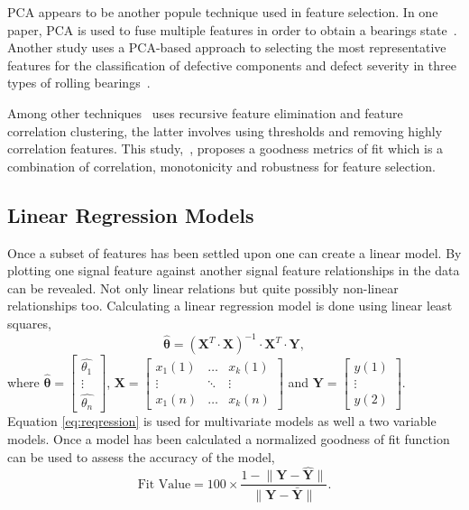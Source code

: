 \documentclass[]{article}
\begin{document}
\gls{PCA} appears to be another popule technique used in feature selection. In one paper, PCA is used to fuse multiple features in order to obtain a bearings state~\cite{lu2016degradation}. Another study uses a PCA-based approach to selecting the most representative features for the classification of defective components and defect severity in three types of rolling bearings~\cite{malhi2004pca}. 

Among other techniques~\cite{buckley2023feature} uses recursive feature elimination and feature correlation clustering, the latter involves using thresholds and removing highly correlation features. This study,~\cite{zhang2016degradation}, proposes a goodness metrics of fit which is a combination of correlation, monotonicity and robustness for feature selection.


\subsection{Linear Regression Models}
Once a subset of features has been settled upon one can create a linear model. By plotting one signal feature against another signal feature relationships in the data can be revealed. Not only linear relations but quite possibly non-linear relationships too. Calculating a linear regression model is done using linear least squares, 
\begin{equation} \label{eq:reqression}
	\hat{\boldsymbol{\theta}} = (\mathbf{X}^T \cdot \mathbf{X})^{-1} \cdot \mathbf{X}^T \cdot \mathbf{Y},
\end{equation}
where $ \hat{\boldsymbol{\theta}} = \begin{bmatrix} \hat{\theta_{1}} \\ \vdots \\ \hat{\theta_{n}} \end{bmatrix} $, $ \mathbf{X} = \begin{bmatrix} x_{1}(1) & \hdots & x_{k}(1) \\ \vdots & \ddots & \vdots \\ x_{1}(n) & \hdots & x_{k}(n)  \end{bmatrix}$ and 
$ \mathbf{Y} = \begin{bmatrix} y(1) \\ \vdots \\ y(2)\end{bmatrix}$.\\
Equation \ref{eq:reqression} is used for multivariate models as well a two variable models. Once a model has been calculated a normalized goodness of fit function can be used to assess the accuracy of the model,
\begin{equation}
	\textrm{Fit Value} = 100 \times \frac{ 1 - \lVert\mathbf{Y} - \mathbf{\hat{Y}}\rVert } { \lVert \mathbf{Y} - \mathbf{\bar{Y}} \rVert }.
\end{equation}
\end{document}
